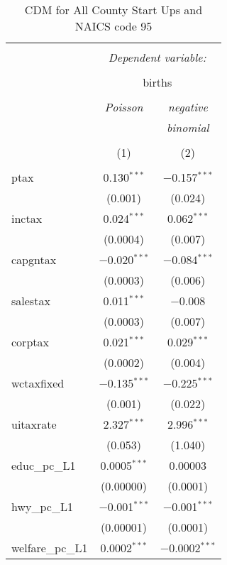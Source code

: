 
\begin{table}[!htbp] \centering 
  \caption{CDM for All County Start Ups and NAICS code 95} 
  \label{} 
\begin{tabular}{@{\extracolsep{5pt}}lcc} 
\\[-1.8ex]\hline 
\hline \\[-1.8ex] 
 & \multicolumn{2}{c}{\textit{Dependent variable:}} \\ 
\cline{2-3} 
\\[-1.8ex] & \multicolumn{2}{c}{births} \\ 
\\[-1.8ex] & \textit{Poisson} & \textit{negative} \\ 
 & \textit{} & \textit{binomial} \\ 
\\[-1.8ex] & (1) & (2)\\ 
\hline \\[-1.8ex] 
 ptax & 0.130$^{***}$ & $-$0.157$^{***}$ \\ 
  & (0.001) & (0.024) \\ 
  inctax & 0.024$^{***}$ & 0.062$^{***}$ \\ 
  & (0.0004) & (0.007) \\ 
  capgntax & $-$0.020$^{***}$ & $-$0.084$^{***}$ \\ 
  & (0.0003) & (0.006) \\ 
  salestax & 0.011$^{***}$ & $-$0.008 \\ 
  & (0.0003) & (0.007) \\ 
  corptax & 0.021$^{***}$ & 0.029$^{***}$ \\ 
  & (0.0002) & (0.004) \\ 
  wctaxfixed & $-$0.135$^{***}$ & $-$0.225$^{***}$ \\ 
  & (0.001) & (0.022) \\ 
  uitaxrate & 2.327$^{***}$ & 2.996$^{***}$ \\ 
  & (0.053) & (1.040) \\ 
  educ\_pc\_L1 & 0.0005$^{***}$ & 0.00003 \\ 
  & (0.00000) & (0.0001) \\ 
  hwy\_pc\_L1 & $-$0.001$^{***}$ & $-$0.001$^{***}$ \\ 
  & (0.00001) & (0.0001) \\ 
  welfare\_pc\_L1 & 0.0002$^{***}$ & $-$0.0002$^{***}$ \\ 

\end{tabular}
\end{table}
